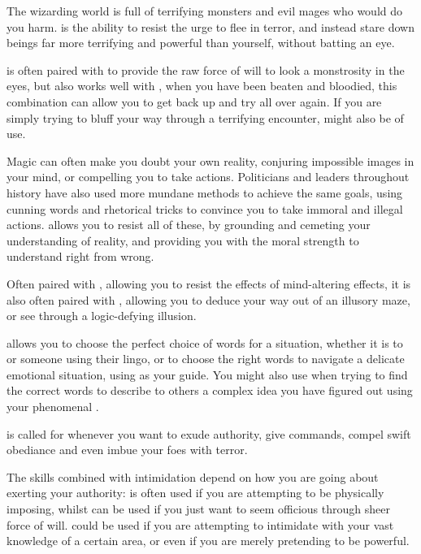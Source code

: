 
The wizarding world is full of terrifying monsters and evil mages who would do you harm.  is the ability to resist the urge to flee in terror, and instead stare down beings far more terrifying and powerful than yourself, without batting an eye. 

 is often paired with  to provide the raw force of will to look a monstrosity in the eyes, but also works well with , when you have been beaten and bloodied, this combination can allow you to get back up and try all over again. If you are simply trying to bluff your way through a terrifying encounter,  might also be of use. 



Magic can often make you doubt your own reality, conjuring impossible images in your mind, or compelling you to take actions. Politicians and leaders throughout history have also used more mundane methods to achieve the same goals, using cunning words and rhetorical tricks to convince you to take immoral and illegal actions.  allows you to resist all of these, by grounding and cemeting your understanding of reality, and providing you with the moral strength to understand right from wrong. 

Often paired with , allowing you to resist the effects of mind-altering effects, it is also often paired with , allowing you to deduce your way out of an illusory maze, or see through a logic-defying illusion.  

 allows you to choose the perfect choice of words for a situation, whether it is to  or  someone using their lingo, or to choose the right words to navigate a delicate emotional situation, using  as your guide. You might also use  when trying to find the correct words to describe to others a complex idea you have figured out using your phenomenal .


 is called for whenever you want to exude authority, give commands, compel swift obediance and even imbue your foes with terror. 

The skills combined with intimidation depend on how you are going about exerting your authority:  is often used if you are attempting to be physically imposing, whilst  can be used if you just want to seem officious through sheer force of will.  could be used if you are attempting to intimidate with your vast knowledge of a certain area, or even  if you are merely pretending to be powerful. 


